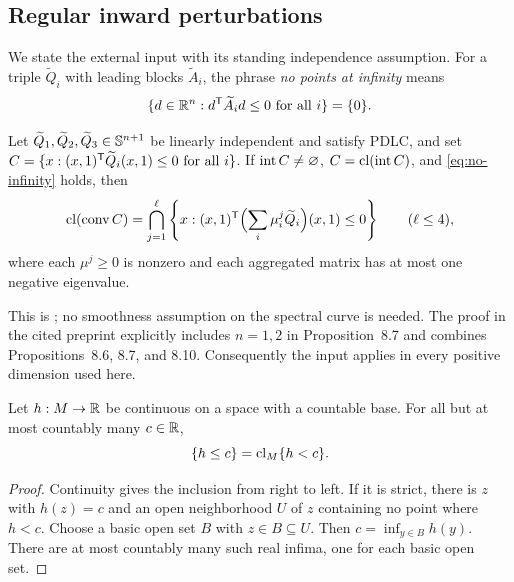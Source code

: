 \subsection{Regular inward perturbations}

We state the external input with its standing independence assumption.
For a triple $\widetilde Q_i$ with leading blocks $\widetilde A_i$,
the phrase \emph{no points at infinity} means
\begin{equation}\label{eq:no-infinity}
 \{d\in\mathbb R^n:d^{\mathsf T}\widetilde A_i d\leq0\text{ for all }i\}
 =\{0\}.
\end{equation}

\begin{theorem}
\label{thm:bd-four-input}
Let $\widetilde Q_1,\widetilde Q_2,\widetilde Q_3\in\mathbb S^{n+1}$
be linearly independent and satisfy PDLC, and set
$C=\{x:(x,1)^{\mathsf T}\widetilde Q_i(x,1)\leq0\text{ for all }i\}$.
If $\operatorname{int} C\ne\varnothing$, $C=\operatorname{cl}(\operatorname{int} C)$, and
\eqref{eq:no-infinity} holds, then
\[
 \operatorname{cl}(\operatorname{conv} C)=\bigcap_{j=1}^{\ell}
 \left\{x:(x,1)^{\mathsf T}\Bigl(\sum_i\mu_i^j\widetilde Q_i\Bigr)(x,1)
 \leq0\right\}
 \qquad(\ell\leq4),
\]
where each $\mu^j\geq0$ is nonzero and each aggregated matrix has
at most one negative eigenvalue.
\end{theorem}

This is \citet[Theorem~1.4]{BD2025,BDpreprint}; no smoothness
assumption on the spectral curve is needed. The proof in the cited
preprint explicitly includes $n=1,2$ in Proposition~8.7 and combines
Propositions~8.6, 8.7, and 8.10. Consequently the input applies in
every positive dimension used here.

\begin{lemma}\label{lem:regular-levels}
Let $h:M\to\mathbb R$ be continuous on a space with a countable base.
For all but at most countably many $c\in\mathbb R$,
\[
 \{h\leq c\}=\operatorname{cl}_M\{h<c\}.
\]
\end{lemma}
\begin{proof}
Continuity gives the inclusion from right to left. If it is strict,
there is $z$ with $h(z)=c$ and an open neighborhood $U$ of $z$
containing no point where $h<c$. Choose a basic open set $B$ with
$z\in B\subseteq U$. Then $c=\inf_{y\in B}h(y)$. There are at
most countably many such real infima, one for each basic open set.
\end{proof}

